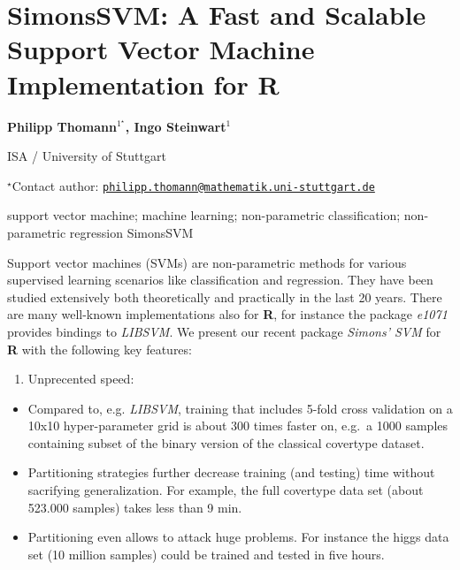 \documentclass[\main/boa.tex]{subfiles}
\begin{document}
\pagestyle{empty}

\section{SimonsSVM: A Fast and Scalable Support Vector Machine Implementation for
R}

\begin{center}
  {\bf Philipp Thomann$^{1^\star}$, Ingo Steinwart$^{1}$}
\end{center}

\vskip 0.3cm

\begin{affiliations}
\begin{enumerate}
\begin{minipage}{0.915\textwidth}
\centering
\item ISA / University of Stuttgart \\[-2pt]
\end{minipage}
\end{enumerate}
$^\star$Contact author: \href{mailto:philipp.thomann@mathematik.uni-stuttgart.de}{\nolinkurl{philipp.thomann@mathematik.uni-stuttgart.de}}\\
\end{affiliations}

\vskip 0.5cm

\begin{minipage}{0.915\textwidth}
\keywords support vector machine; machine learning; non-parametric classification;
non-parametric regression
\packages SimonsSVM
\end{minipage}

\vskip 0.8cm

Support vector machines (SVMs) are non-parametric methods for various
supervised learning scenarios like classification and regression. They
have been studied extensively both theoretically and practically in the
last 20 years. There are many well-known implementations also for
\textbf{R}, for instance the package \emph{e1071} provides bindings to
\emph{LIBSVM}. We present our recent package \emph{Simons' SVM} for
\textbf{R} with the following key features:

\begin{enumerate}
\def\labelenumi{\arabic{enumi}.}
\tightlist
\item
  Unprecented speed:
\end{enumerate}

\begin{itemize}
\tightlist
\item
  Compared to, e.g. \emph{LIBSVM}, training that includes 5-fold cross
  validation on a 10x10 hyper-parameter grid is about 300 times faster
  on, e.g.~a 1000 samples containing subset of the binary version of the
  classical covertype dataset.
\item
  Partitioning strategies further decrease training (and testing) time
  without sacrifying generalization. For example, the full covertype
  data set (about 523.000 samples) takes less than 9 min.
\item
  Partitioning even allows to attack huge problems. For instance the
  higgs data set (10 million samples) could be trained and tested in
  five hours.
\end{itemize}
\end{document}
